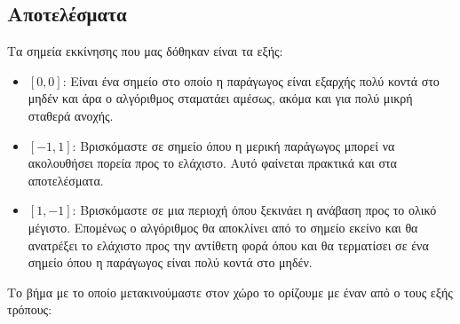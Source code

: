 \documentclass{report}
\begin{document}
\subsection{Αποτελέσματα}
Τα σημεία εκκίνησης που μας δόθηκαν είναι τα εξής:
\begin{itemize}
    \item \([0,0]\): Είναι ένα σημείο στο οποίο η παράγωγος είναι εξαρχής πολύ κοντά στο μηδέν και άρα 
    ο αλγόριθμος σταματάει αμέσως, ακόμα και για πολύ μικρή σταθερά ανοχής.
    \item \([-1,1]\): Βρισκόμαστε σε σημείο όπου η μερική παράγωγος μπορεί να ακολουθήσει πορεία προς το
    ελάχιστο. Αυτό φαίνεται πρακτικά και στα αποτελέσματα.
    \item \([1,-1]\): Βρισκόμαστε σε μια περιοχή όπου ξεκινάει η ανάβαση προς το ολικό μέγιστο. Επομένως
    ο αλγόριθμος θα αποκλίνει από το σημείο εκείνο και θα ανατρέξει το ελάχιστο προς την αντίθετη φορά
    όπου και θα τερματίσει σε ένα σημείο όπου η παράγωγος είναι πολύ κοντά στο μηδέν.
\end{itemize}
Το βήμα με το οποίο μετακινούμαστε στον χώρο το ορίζουμε με έναν από ο τους εξής τρόπους:
\end{document}
